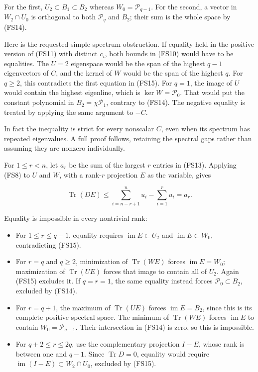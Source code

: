 For the first, \(U_2\subset B_1\subset B_2\) whereas \(W_0=\mathcal P_{q-1}\). For the second, a vector in \(W_2\cap U_0\) is orthogonal to both \(\mathcal P_q\) and \(B_2\); their sum is the whole space by (FS14).

Here is the requested simple-spectrum obstruction. If equality held in the positive version of (FS11) with distinct \(c_i\), both bounds in (FS10) would have to be equalities. The \(U=2\) eigenspace would be the span of the highest \(q-1\) eigenvectors of \(C\), and the kernel of \(W\) would be the span of the highest \(q\). For \(q\ge2\), this contradicts the first equation in (FS15). For \(q=1\), the image of \(U\) would contain the highest eigenline, which is \(\ker W=\mathcal P_0\). That would put the constant polynomial in \(B_2=\chi\mathcal P_1\), contrary to (FS14). The negative equality is treated by applying the same argument to \(-C\).

In fact the inequality is strict for every nonscalar \(C\), even when its spectrum has repeated eigenvalues. A full proof follows, retaining the spectral gaps rather than assuming they are nonzero individually.

For \(1\le r<n\), let \(a_r\) be the sum of the largest \(r\) entries in (FS13). Applying (FS8) to \(U\) and \(W\), with a rank-\(r\) projection \(E\) as the variable, gives

\[
\operatorname{Tr}(DE)
\le \sum_{i=n-r+1}^n u_i-\sum_{i=1}^r u_i=a_r.
\tag{FS16}
\]

Equality is impossible in every nontrivial rank:

\begin{itemize}
\tightlist
\item
  For \(1\le r\le q-1\), equality requires \(\operatorname{im}E\subset U_2\) and \(\operatorname{im}E\subset W_0\), contradicting (FS15).
\item
  For \(r=q\) and \(q\ge2\), minimization of \(\operatorname{Tr}(WE)\) forces \(\operatorname{im}E=W_0\); maximization of \(\operatorname{Tr}(UE)\) forces that image to contain all of \(U_2\). Again (FS15) excludes it. If \(q=r=1\), the same equality instead forces \(\mathcal P_0\subset B_2\), excluded by (FS14).
\item
  For \(r=q+1\), the maximum of \(\operatorname{Tr}(UE)\) forces \(\operatorname{im}E=B_2\), since this is its complete positive spectral space. The minimum of \(\operatorname{Tr}(WE)\) forces \(\operatorname{im}E\) to contain \(W_0=\mathcal P_{q-1}\). Their intersection in (FS14) is zero, so this is impossible.
\item
  For \(q+2\le r\le2q\), use the complementary projection \(I-E\), whose rank is between one and \(q-1\). Since \(\operatorname{Tr}D=0\), equality would require \(\operatorname{im}(I-E)\subset W_2\cap U_0\), excluded by (FS15).
\end{itemize}

